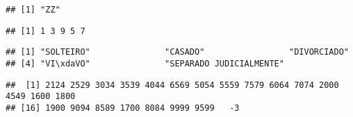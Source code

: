 \documentclass[
]{article}
\newenvironment{Shaded}{\begin{snugshade}}{\end{snugshade}}
\newcommand{\FunctionTok}[1]{\textcolor[rgb]{0.13,0.29,0.53}{\textbf{#1}}}
\newcommand{\NormalTok}[1]{#1}
\newcommand{\SpecialCharTok}[1]{\textcolor[rgb]{0.81,0.36,0.00}{\textbf{#1}}}
\begin{document}
\begin{Shaded}
\end{Shaded}

\begin{verbatim}
## [1] "ZZ"
\end{verbatim}

\begin{Shaded}
\end{Shaded}

\begin{verbatim}
## [1] 1 3 9 5 7
\end{verbatim}

\begin{Shaded}
\end{Shaded}

\begin{verbatim}
## [1] "SOLTEIRO"               "CASADO"                 "DIVORCIADO"            
## [4] "VI\xdaVO"               "SEPARADO JUDICIALMENTE"
\end{verbatim}

\begin{Shaded}
\end{Shaded}

\begin{verbatim}
##  [1] 2124 2529 3034 3539 4044 6569 5054 5559 7579 6064 7074 2000 4549 1600 1800
## [16] 1900 9094 8589 1700 8084 9999 9599   -3
\end{verbatim}

\begin{Shaded}
\end{Shaded}
\end{document}
